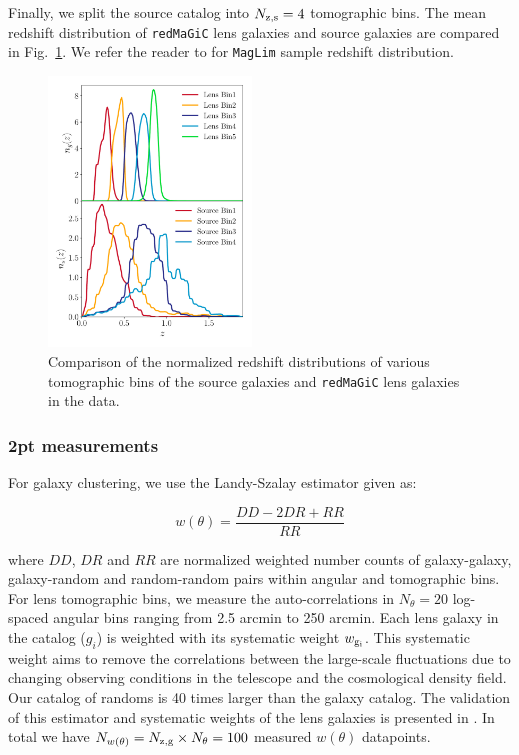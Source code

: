 \documentclass[aps, prd,twocolumn,superscriptaddress,nofootinbib,preprintnumbers]{revtex4-1}
\newcommand{\gammat}{\ensuremath{\gamma_{\rm t}(\theta)}}
\newcommand{\wtheta}{\ensuremath{w(\theta)}}
\newcommand{\redmagic}{\texttt{redMaGiC} }
\newcommand{\maglim}{\texttt{MagLim} }
\newcommand{\blue}[1]{\textcolor{blue}{#1}}
\begin{document}
Finally, we split the source catalog into $N_{\rm z,s} = 4$ tomographic bins. The mean redshift distribution of \redmagic lens galaxies and source galaxies are compared in Fig.~\ref{fig:nz_comp}. We refer the reader to \citet*{y3-2x2ptaltlensresults} for \maglim sample redshift distribution. 
\begin{figure}
\includegraphics[width=0.48\textwidth]{figs/nz_DES.pdf}
\caption[]{Comparison of the normalized redshift distributions of various tomographic bins of the source galaxies and \redmagic lens galaxies in the data.}
\label{fig:nz_comp}
\end{figure}

\subsubsection{2pt measurements}\label{sec:2pt_data}

For galaxy clustering, we use the Landy-Szalay estimator \citep{Landy_Szalay} given as:
\begin{linenomath*}
\begin{equation}
    w(\theta) = \frac{DD - 2DR + RR}{RR}
\end{equation}
\end{linenomath*}
where $DD$, $DR$ and $RR$ are normalized weighted number counts of galaxy-galaxy, galaxy-random and random-random pairs within angular and tomographic bins. For lens tomographic bins, we measure the auto-correlations in $N_{\theta} = 20$ log-spaced angular bins ranging from 2.5 arcmin to 250 arcmin. Each lens galaxy in the catalog ($g_i$) is weighted with its systematic weight $w_{\rm g_i}$. This systematic weight aims to remove the correlations between the large-scale fluctuations due to changing observing conditions in the telescope and the cosmological density field. Our catalog of randoms is 40 times larger than the galaxy catalog. The validation of this estimator and systematic weights of the lens galaxies is presented in \cite{y3-galaxyclustering}. In total we have $N_{\wtheta} = N_{\rm z,g} \times N_{\theta} = 100$ measured $\wtheta$ datapoints. 
\end{document}
